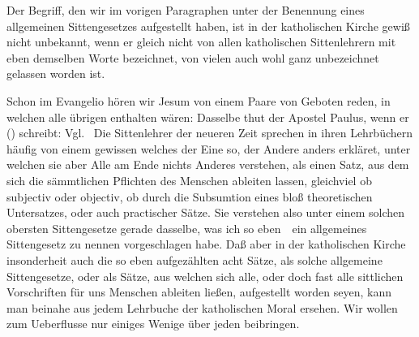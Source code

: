 Der Begriff, den wir im vorigen Paragraphen unter der Benennung eines allgemeinen Sittengesetzes aufgestellt haben, ist in der katholischen Kirche gewiß nicht unbekannt, wenn er gleich nicht von allen katholischen Sittenlehrern mit eben demselben Worte bezeichnet, von vielen auch wohl ganz unbezeichnet gelassen worden ist.\par
Schon im Evangelio  hören wir Jesum von einem Paare von Geboten reden, in welchen alle übrigen enthalten wären:  Dasselbe thut der Apostel Paulus, wenn er () schreibt:  Vgl.\  Die Sittenlehrer der neueren Zeit sprechen in ihren Lehrbüchern häufig von einem gewissen  welches der Eine so, der Andere anders erkläret, unter welchen sie aber Alle am Ende nichts Anderes verstehen, als einen Satz, aus dem sich die sämmtlichen Pflichten des Menschen ableiten lassen, gleichviel ob subjectiv oder objectiv, ob durch die Subsumtion eines bloß theoretischen Untersatzes, oder auch practischer Sätze. Sie verstehen also unter einem solchen obersten Sittengesetze gerade dasselbe, was ich so eben~\ ein allgemeines Sittengesetz zu nennen vorgeschlagen habe. Daß aber in der katholischen Kirche insonderheit auch die so eben aufgezählten acht Sätze, als solche allgemeine Sittengesetze, oder als Sätze, aus welchen sich alle, oder doch fast alle sittlichen Vorschriften für uns Menschen ableiten ließen, aufgestellt worden seyen, kann man beinahe aus jedem Lehrbuche der katholischen Moral ersehen. Wir wollen zum Ueberflusse nur einiges Wenige über jeden beibringen.
